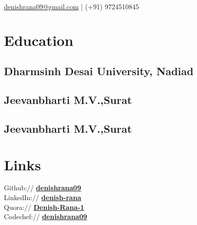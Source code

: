 \documentclass[]{denish-resume-openfont}
\begin{document}
%
%
\lastupdated

%
%
{ \href{mailto:denishrana09@gmail.com}{denishrana09@gmail.com} | (+91) 9724510845 }
%
%

\begin{minipage}[t]{0.3\textwidth}


\section{Education}

\subsection{Dharmsinh Desai \newline University, Nadiad}
\sectionsep

\subsection{Jeevanbharti M.V.,\newline Surat}
\sectionsep

\subsection{Jeevanbharti M.V.,\newline Surat}
\sectionsep



\section{Links}

Github:// \href{https://github.com/denishrana09}{\bf denishrana09} \\
LinkedIn://  \href{https://www.linkedin.com/in/denish-rana/}{\bf denish-rana} \\
Quora://  \href{https://www.quora.com/profile/Denish-Rana-1}{\bf Denish-Rana-1} \\
Codechef:// \href {https://www.codechef.com/users/denishrana09}{\bf denishrana09} \\


\end{minipage}
\end{document}
